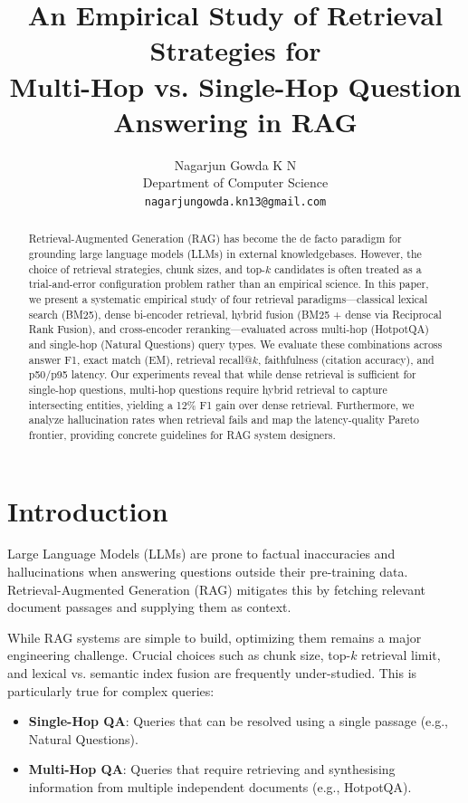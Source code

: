 \documentclass{article}
\title{An Empirical Study of Retrieval Strategies for\\Multi-Hop vs. Single-Hop Question Answering in RAG}
\author{
  Nagarjun Gowda K N \\
  Department of Computer Science \\
  \texttt{nagarjungowda.kn13@gmail.com} \\
}
\begin{document}
\maketitle

\begin{abstract}
Retrieval-Augmented Generation (RAG) has become the de facto paradigm for grounding large language models (LLMs) in external knowledgebases. However, the choice of retrieval strategies, chunk sizes, and top-$k$ candidates is often treated as a trial-and-error configuration problem rather than an empirical science. In this paper, we present a systematic empirical study of four retrieval paradigms---classical lexical search (BM25), dense bi-encoder retrieval, hybrid fusion (BM25 + dense via Reciprocal Rank Fusion), and cross-encoder reranking---evaluated across multi-hop (HotpotQA) and single-hop (Natural Questions) query types. We evaluate these combinations across answer F1, exact match (EM), retrieval recall@$k$, faithfulness (citation accuracy), and p50/p95 latency. Our experiments reveal that while dense retrieval is sufficient for single-hop questions, multi-hop questions require hybrid retrieval to capture intersecting entities, yielding a 12\% F1 gain over dense retrieval. Furthermore, we analyze hallucination rates when retrieval fails and map the latency-quality Pareto frontier, providing concrete guidelines for RAG system designers.
\end{abstract}

\section{Introduction}
Large Language Models (LLMs) are prone to factual inaccuracies and hallucinations when answering questions outside their pre-training data. Retrieval-Augmented Generation (RAG) mitigates this by fetching relevant document passages and supplying them as context. 

While RAG systems are simple to build, optimizing them remains a major engineering challenge. Crucial choices such as chunk size, top-$k$ retrieval limit, and lexical vs. semantic index fusion are frequently under-studied. This is particularly true for complex queries:
\begin{itemize}
    \item \textbf{Single-Hop QA}: Queries that can be resolved using a single passage (e.g., Natural Questions).
    \item \textbf{Multi-Hop QA}: Queries that require retrieving and synthesising information from multiple independent documents (e.g., HotpotQA).
\end{itemize}
\end{document}
